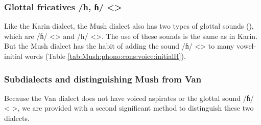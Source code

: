 \subsubsection{Glottal fricatives /h, ɦ/ <>}


Like the Karin dialect, the Mush dialect also has two types of glottal sounds (), which are /ɦ/ <> and /h/ <>. The use of these sounds is the same as in Karin. But the Mush dialect has the habit of adding the sound /ɦ/ <> to many vowel-initial words (Table \ref{tab:Mush:phono:cons:voice:initialH}). 


\begin{table}[H]
	\centering
	\caption{Insertion of word-initial voiced glottal fricative /ɦ/ <> in the Mush dialect}
	\label{tab:Mush:phono:cons:voice:initialH}
\end{table}

\subsubsection{Subdialects and distinguishing Mush from Van}

Because the Van dialect does not have voiced aspirates or the glottal sound /ɦ/ < >, we are provided with a second significant method to distinguish these two dialects. 

